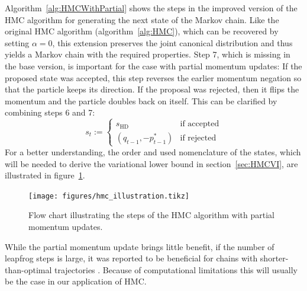 Algorithm~\ref{alg:HMCWithPartial} shows the steps in the improved version of the HMC algorithm for generating the next state of the Markov chain. Like the original HMC algorithm (algorithm~\ref{alg:HMC}), which can be recovered by setting $\alpha = 0$, this extension preserves the joint canonical distribution and thus yields a Markov chain with the required properties. Step 7, which is missing in the base version, is important for the case with partial momentum updates: If the proposed state was accepted, this step reverses the earlier momentum negation so that the particle keeps its direction. If the proposal was rejected, then it flips the momentum and the particle doubles back on itself. This can be clarified by combining steps 6 and 7:
\begin{equation} \label{eq:StateAfterAcceptReject}
s_t := \begin{cases} s_\textrm{HD} & \textrm{if accepted} \\ 
								(q_{t-1}, -p^*_{t-1}) & \textrm{if rejected}
					  \end{cases}
\end{equation}
For a better understanding, the order and used nomenclature of the states, which will be needed to derive the variational lower bound in section~\ref{sec:HMCVI}, are illustrated in figure~\ref{fig:HMC_schematic}.

\begin{figure}
\centering
\texttt{[image: figures/hmc\_illustration.tikz]}
\caption{Flow chart illustrating the steps of the HMC algorithm with partial momentum updates.}
\label{fig:HMC_schematic}
\end{figure}

While the partial momentum update brings little benefit, if the number of leapfrog steps is large, it was reported to be beneficial for chains with shorter-than-optimal trajectories \parencite{Neal2011}. Because of computational limitations this will usually be the case in our application of HMC.